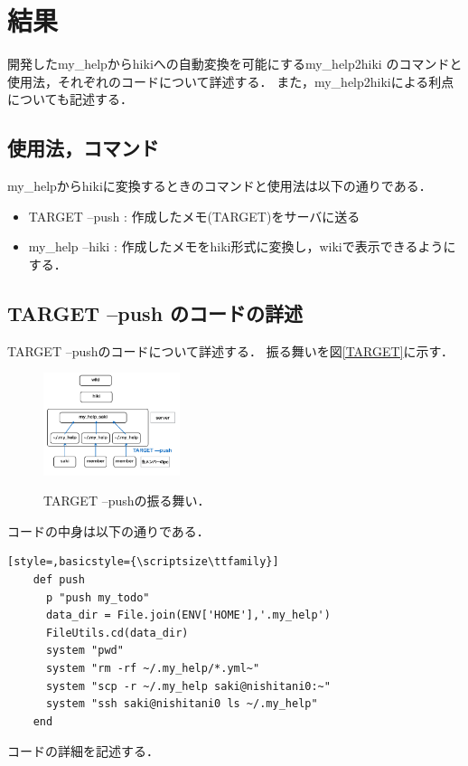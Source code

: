 \section{結果}
開発したmy\_helpからhikiへの自動変換を可能にするmy\_help2hiki
のコマンドと使用法，それぞれのコードについて詳述する．
また，my\_help2hikiによる利点についても記述する．

\subsection{使用法，コマンド}
my\_helpからhikiに変換するときのコマンドと使用法は以下の通りである．
\begin{itemize}
\item TARGET --push : 作成したメモ(TARGET)をサーバに送る
\end{itemize}  
\begin{itemize}
\item my\_help --hiki : 作成したメモをhiki形式に変換し，wikiで表示できるようにする．
\end{itemize}

\subsection{TARGET --push のコードの詳述}
TARGET --pushのコードについて詳述する．
振る舞いを図\ref{TARGET}に示す．
\begin{figure}[htbp]\begin{center}
\includegraphics[width=4cm,bb=100 100 600 900]{my_help2hiki_saki.012.png}
\caption{TARGET --pushの振る舞い．}\label{TARGET}
\label{default}\end{center}\end{figure}

コードの中身は以下の通りである．
\begin{lstlisting}[style=,basicstyle={\scriptsize\ttfamily}]
    def push
      p "push my_todo"
      data_dir = File.join(ENV['HOME'],'.my_help')
      FileUtils.cd(data_dir)
      system "pwd"
      system "rm -rf ~/.my_help/*.yml~"
      system "scp -r ~/.my_help saki@nishitani0:~"
      system "ssh saki@nishitani0 ls ~/.my_help" 
    end
\end{lstlisting}
コードの詳細を記述する．

